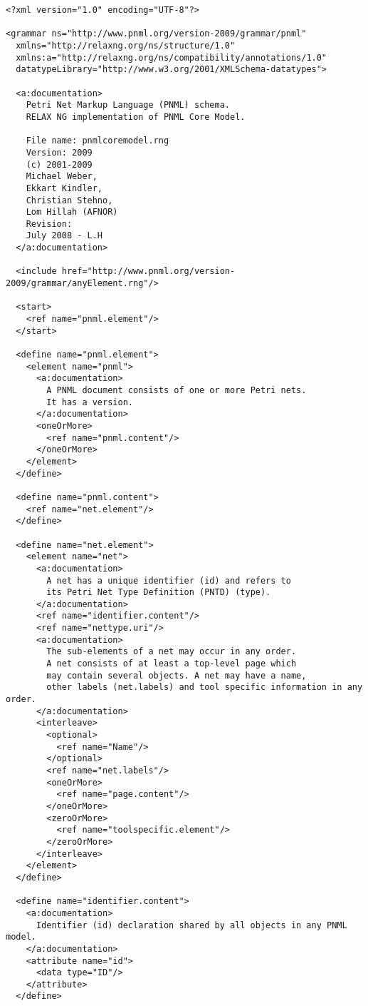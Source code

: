 \begin{lstlisting}[label=grammar_core,caption=RELAX NG implementation of PNML Core Model]
<?xml version="1.0" encoding="UTF-8"?>

<grammar ns="http://www.pnml.org/version-2009/grammar/pnml"
  xmlns="http://relaxng.org/ns/structure/1.0"
  xmlns:a="http://relaxng.org/ns/compatibility/annotations/1.0"
  datatypeLibrary="http://www.w3.org/2001/XMLSchema-datatypes">

  <a:documentation>
    Petri Net Markup Language (PNML) schema.
    RELAX NG implementation of PNML Core Model.

    File name: pnmlcoremodel.rng
    Version: 2009
    (c) 2001-2009
    Michael Weber,
    Ekkart Kindler,
    Christian Stehno, 
    Lom Hillah (AFNOR)
    Revision:
    July 2008 - L.H
  </a:documentation>

  <include href="http://www.pnml.org/version-2009/grammar/anyElement.rng"/>

  <start>
    <ref name="pnml.element"/>
  </start>
  
  <define name="pnml.element">
    <element name="pnml">
      <a:documentation>
        A PNML document consists of one or more Petri nets.
        It has a version.
      </a:documentation>
      <oneOrMore>
        <ref name="pnml.content"/>
      </oneOrMore>
    </element>
  </define>

  <define name="pnml.content">
    <ref name="net.element"/>
  </define>

  <define name="net.element">
    <element name="net">
      <a:documentation>
        A net has a unique identifier (id) and refers to
        its Petri Net Type Definition (PNTD) (type).
      </a:documentation>
      <ref name="identifier.content"/>
      <ref name="nettype.uri"/>
      <a:documentation>
        The sub-elements of a net may occur in any order. 
        A net consists of at least a top-level page which 
        may contain several objects. A net may have a name,
        other labels (net.labels) and tool specific information in any order.   
      </a:documentation>
      <interleave>
        <optional>
          <ref name="Name"/>
        </optional>
        <ref name="net.labels"/>
        <oneOrMore>
          <ref name="page.content"/>
        </oneOrMore>
        <zeroOrMore>
          <ref name="toolspecific.element"/>
        </zeroOrMore>
      </interleave>
    </element>
  </define>

  <define name="identifier.content">
    <a:documentation>
      Identifier (id) declaration shared by all objects in any PNML model.
    </a:documentation>
    <attribute name="id">
      <data type="ID"/>
    </attribute>
  </define>


\end{lstlisting}
